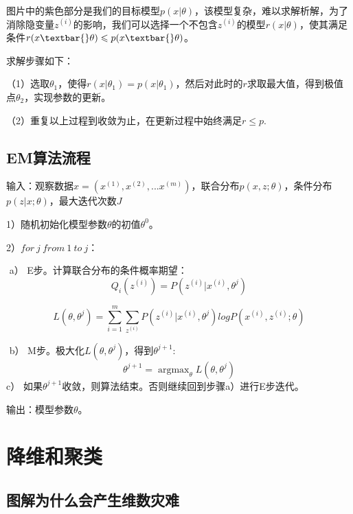  

​
图片中的紫色部分是我们的目标模型$p(x|\theta)$，该模型复杂，难以求解析解，为了消除隐变量$z^{(i)}$的影响，我们可以选择一个不包含$z^{(i)}$的模型$r(x|\theta)$，使其满足条件$r(x\textbar{}\theta)
\leqslant p(x\textbar{}\theta) $。

求解步骤如下：

（1）选取$\theta_1$，使得$r(x|\theta_1) = p(x|\theta_1)$，然后对此时的$r$求取最大值，得到极值点$\theta_2$，实现参数的更新。

（2）重复以上过程到收敛为止，在更新过程中始终满足$r \leqslant p $.

\subsection{ EM算法流程}\label{emux7b97ux6cd5ux6d41ux7a0b}

输入：观察数据$x=(x^{(1)},x^{(2)},...x^{(m)})$，联合分布$p(x,z ;\theta)$，条件分布$p(z|x; \theta)$，最大迭代次数$J$

1）随机初始化模型参数$\theta$的初值$\theta^0$。

2）$for \ j \ from \ 1 \ to \ j$：

​ a） E步。计算联合分布的条件概率期望： \[
Q_i(z^{(i)}) = P( z^{(i)}|x^{(i)}, \theta^{j})
\]

\[
L(\theta, \theta^{j}) = \sum\limits_{i=1}^m\sum\limits_{z^{(i)}}P( z^{(i)}|x^{(i)}, \theta^{j})log{P(x^{(i)}, z^{(i)};\theta)}
\]

​ b） M步。极大化$L(\theta, \theta^{j})$，得到$\theta^{j+1}$: \[
\theta^{j+1} = \mathop{\arg\max}_\theta L(\theta, \theta^{j})
\] ​ c）
如果$\theta^{j+1}$收敛，则算法结束。否则继续回到步骤a）进行E步迭代。

输出：模型参数$\theta​$。

\section{ 降维和聚类}\label{ux964dux7ef4ux548cux805aux7c7b}

\subsection{图解为什么会产生维数灾难}\label{ux56feux89e3ux4e3aux4ec0ux4e48ux4f1aux4ea7ux751fux7ef4ux6570ux707eux96be}

